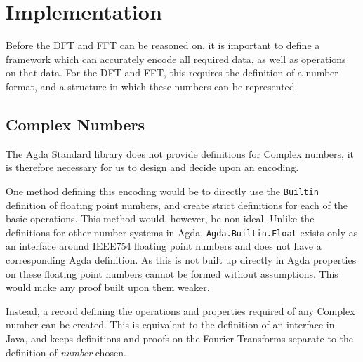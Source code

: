 \section{Implementation}

Before the DFT and FFT can be reasoned on, it is important to define a 
framework which can accurately encode all required data, as well as 
operations on that data. 
For the DFT and FFT, this requires the definition of a number format, and a
structure in which these numbers can be represented.


\subsection{Complex Numbers}
\label{sec:complex_numbers}

The Agda Standard library does not provide definitions for Complex numbers, it
is therefore necessary for us to design and decide upon an encoding.

One method defining this encoding would be to directly use the \verb|Builtin| 
definition of floating point numbers, and create strict definitions for each 
of the basic operations. 
This method would, however, be non ideal.
Unlike the definitions for other number systems in Agda, 
\verb|Agda.Builtin.Float| exists only as an interface around IEEE754  
floating point numbers and does not have a corresponding Agda definition. 
As this is not built up directly in Agda properties on these floating point
numbers cannot be formed without assumptions.
This would make any proof built upon them weaker.

Instead, a record defining the operations and properties required of any Complex 
number can be created.
This is equivalent to the definition of an interface in Java, and keeps 
definitions and proofs on the Fourier Transforms separate to the definition of 
\textit{number} chosen. 


